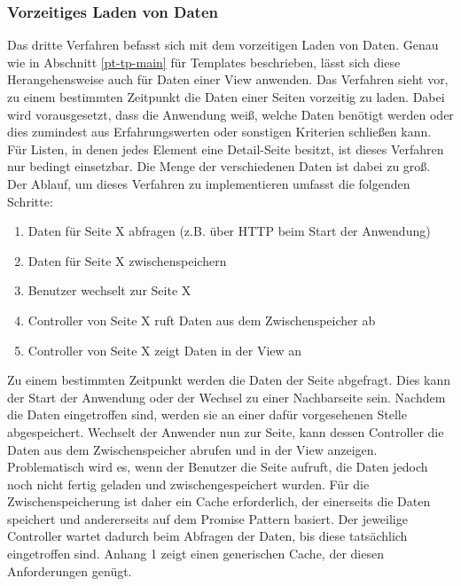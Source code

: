 \subsubsection{Vorzeitiges Laden von Daten}
Das dritte Verfahren befasst sich mit dem vorzeitigen Laden von Daten. Genau wie in Abschnitt \ref{pt-tp-main} für \glspl{Template} beschrieben, lässt sich diese Herangehensweise auch für Daten einer View anwenden. Das Verfahren sieht vor, zu einem bestimmten Zeitpunkt die Daten einer Seiten vorzeitig zu laden. Dabei wird vorausgesetzt, dass die Anwendung weiß, welche Daten benötigt werden oder dies zumindest aus Erfahrungswerten oder sonstigen Kriterien schließen kann. Für Listen, in denen jedes Element eine Detail-Seite besitzt, ist dieses Verfahren nur bedingt einsetzbar. Die Menge der verschiedenen Daten ist dabei zu groß. Der Ablauf, um dieses Verfahren zu implementieren umfasst die folgenden Schritte:
\begin{enumerate}
	\item Daten für Seite X abfragen (z.B. über HTTP beim Start der Anwendung)
	\item Daten für Seite X zwischenspeichern
	\item Benutzer wechselt zur Seite X
	\item Controller von Seite X ruft Daten aus dem Zwischenspeicher ab
	\item Controller von Seite X zeigt Daten in der View an
\end{enumerate}
Zu einem bestimmten Zeitpunkt werden die Daten der Seite abgefragt. Dies kann der Start der Anwendung oder der Wechsel zu einer Nachbarseite sein. Nachdem die Daten eingetroffen sind, werden sie an einer dafür vorgesehenen Stelle abgespeichert. Wechselt der Anwender nun zur Seite, kann dessen Controller die Daten aus dem Zwischenspeicher abrufen und in der View anzeigen. Problematisch wird es, wenn der Benutzer die Seite aufruft, die Daten jedoch noch nicht fertig geladen und zwischengespeichert wurden. Für die Zwischenspeicherung ist daher ein Cache erforderlich, der einerseits die Daten speichert und andererseits auf dem \gls{Promise} Pattern basiert. Der jeweilige Controller wartet dadurch beim Abfragen der Daten, bis diese tatsächlich eingetroffen sind. Anhang 1 zeigt einen generischen Cache, der diesen Anforderungen genügt. 
